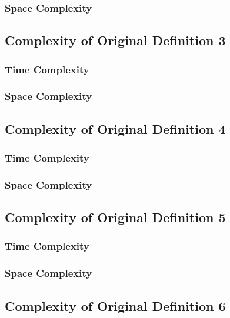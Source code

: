 \documentclass[conference]{IEEEtran}
\begin{document}
\subsubsection{Space Complexity}

\subsection{Complexity of Original Definition 3}

\subsubsection{Time Complexity}

\subsubsection{Space Complexity}

\subsection{Complexity of Original Definition 4}

\subsubsection{Time Complexity}

\subsubsection{Space Complexity}

\subsection{Complexity of Original Definition 5}

\subsubsection{Time Complexity}

\subsubsection{Space Complexity}

\subsection{Complexity of Original Definition 6}
\end{document}
